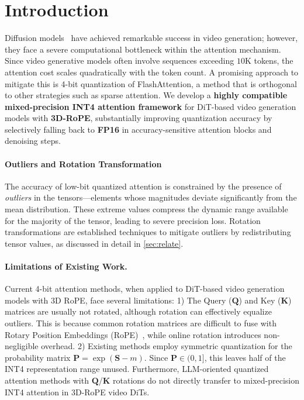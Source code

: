 

\section{Introduction}

Diffusion models~\cite{peebles2023dit} have achieved remarkable success in video generation; however, they face a severe computational bottleneck within the attention mechanism. Since video generative models often involve sequences exceeding $10\text{K}$ tokens, the attention cost scales quadratically with the token count. A promising approach to mitigate this is 4-bit quantization of FlashAttention, a method that is orthogonal to other strategies such as sparse attention\cite{zhang2025spargeattention,yang2025sparse,zhang2025sla,xi2025sparse,liu2021swin,chu2021twins,xiao2023efficient,xiao2024infllm,chen2024longlora,jiang2024minference,venkataramanan2024skipattention,yuan2024ditfastattn, zhang2025fast}. We develop a \textbf{highly compatible mixed-precision INT4 attention framework} for DiT-based video generation models with \textbf{3D-RoPE},
substantially improving quantization accuracy by selectively falling back to \textbf{FP16} in accuracy-sensitive attention blocks and denoising steps.

\paragraph{\textbf{Outliers and Rotation Transformation}}
The accuracy of low-bit quantized attention is constrained by the presence of \textit{outliers} in the tensors---elements whose magnitudes deviate significantly from the mean distribution. These extreme values compress the dynamic range available for the majority of the tensor, leading to severe precision loss. Rotation transformations are established techniques to mitigate outliers by redistributing tensor values, as discussed in detail in \cref{sec:relate}.


\paragraph{\textbf{Limitations of Existing Work.}}
Current 4-bit attention methods, when applied to DiT-based video generation models with 3D RoPE, face several limitations:
1) The Query ($\mathbf{Q}$) and Key ($\mathbf{K}$) matrices are usually not rotated, although rotation can effectively equalize outliers. This is because common rotation matrices are difficult to fuse with Rotary Position Embeddings (RoPE)~\cite{su2024roformer}, while online rotation introduces non-negligible overhead.
2) Existing methods employ symmetric quantization for the probability matrix $\mathbf{P} = \exp(\mathbf{S} - m)$. Since $\mathbf{P} \in (0, 1]$, this leaves half of the INT4 representation range unused.
Furthermore, LLM-oriented quantized attention methods with $\mathbf{Q}$/$\mathbf{K}$ rotations do not directly transfer to mixed-precision INT4 attention in 3D-RoPE video DiTs.




